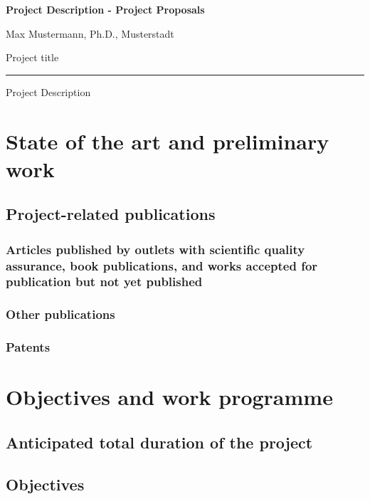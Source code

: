 \documentclass{scrartcl}
\newcommand{\applicants}{Max Mustermann, Ph.D., Musterstadt}
\newcommand{\project}{Project title}
\begin{document}
{\raggedright{} \normalsize \bfseries 
	Project Description - Project Proposals \par
	\applicants{} \par
	\project{} \par
	\rule{\textwidth}{0.5pt} \par
	Project Description
}

\section{State of the art and preliminary work}

\subsection{Project-related publications}

\subsubsection{Articles published by outlets with scientific quality assurance, book publications, and works accepted for publication but not yet published}
\printbibliography[category=reviewed, heading=none]

\subsubsection{Other publications}
\printbibliography[category=nonreviewed, heading=none]

\subsubsection{Patents}

\printbibliography[category=patents_pending, heading=none]

\printbibliography[category=patents, heading=none]


\section{Objectives and work programme}

\subsection{Anticipated total duration of the project}

\subsection{Objectives}
\end{document}
